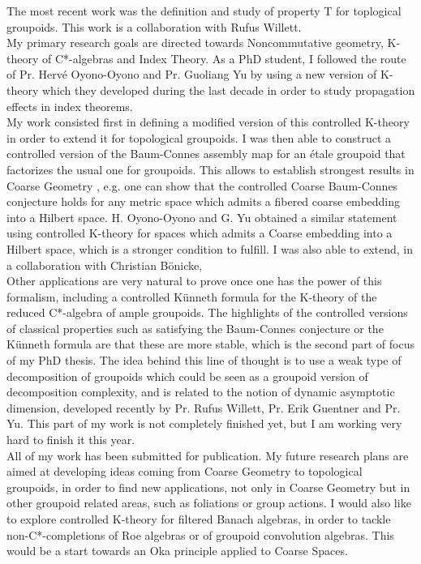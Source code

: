 \documentclass[a4paper]{article}
\begin{document}
The most recent work was the definition and study of property T for toplogical groupoids. This work is a collaboration with Rufus Willett. \\

My primary research goals are directed towards Noncommutative geometry, K-theory of C*-algebras and Index Theory. As a PhD student, I followed the route of Pr. Hervé Oyono-Oyono and Pr. Guoliang Yu by using a new version of K-theory which they developed during the last decade in order to study propagation effects in index theorems.\\

My work consisted first in defining a modified version of this controlled K-theory in order to extend it for topological groupoids. I was then able to construct a controlled version of the Baum-Connes assembly map for an étale groupoid that factorizes the usual one for groupoids. This allows to establish strongest results in Coarse Geometry , e.g. one can show that the controlled Coarse Baum-Connes conjecture holds for any metric space which admits a fibered coarse embedding into a Hilbert space. H. Oyono-Oyono and G. Yu obtained a similar statement using controlled K-theory for spaces which admits a Coarse embedding into a Hilbert space, which is a stronger condition to fulfill. I was also able to extend, in a collaboration with Christian B\"onicke, \\

Other applications are very natural to prove once one has the power of this formalism, including a controlled Künneth formula for the K-theory of the reduced C*-algebra of ample groupoids. The highlights of the controlled versions of classical properties such as satisfying the Baum-Connes conjecture or the Künneth formula are that these are more stable, which is the second part of focus of my PhD thesis. The idea behind this line of thought is to use a weak type of decomposition of groupoids which could be seen as a groupoid version of decomposition complexity, and is related to the notion of dynamic asymptotic dimension, developed recently by Pr. Rufus Willett, Pr. Erik Guentner and Pr. Yu. This part of my work is not completely finished yet, but I am working very hard to finish it this year.\\

All of my work has been submitted for publication. My future research plans are aimed at developing ideas coming from Coarse Geometry to topological groupoids, in order to find new applications, not only in Coarse Geometry but in other groupoid related areas, such as foliations or group actions. I would also like to explore controlled K-theory for filtered Banach algebras, in order to tackle non-C*-completions of Roe algebras or of groupoid convolution algebras. This would be a start towards an Oka principle applied to Coarse Spaces. \\
\end{document}
